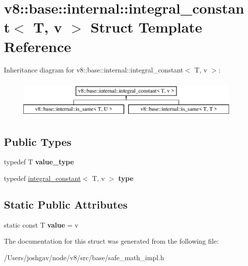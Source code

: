 \hypertarget{structv8_1_1base_1_1internal_1_1integral__constant}{}\section{v8\+:\+:base\+:\+:internal\+:\+:integral\+\_\+constant$<$ T, v $>$ Struct Template Reference}
\label{structv8_1_1base_1_1internal_1_1integral__constant}
Inheritance diagram for v8\+:\+:base\+:\+:internal\+:\+:integral\+\_\+constant$<$ T, v $>$\+:\begin{figure}[H]
\begin{center}
\leavevmode
\includegraphics[height=2.000000cm]{structv8_1_1base_1_1internal_1_1integral__constant}
\end{center}
\end{figure}
\subsection*{Public Types}
\begin{DoxyCompactItemize}
\item 
typedef T {\bfseries value\+\_\+type}\hypertarget{structv8_1_1base_1_1internal_1_1integral__constant_adc3e083f08bc1035153fe02ab192c418}{}\label{structv8_1_1base_1_1internal_1_1integral__constant_adc3e083f08bc1035153fe02ab192c418}

\item 
typedef \hyperlink{structv8_1_1base_1_1internal_1_1integral__constant}{integral\+\_\+constant}$<$ T, v $>$ {\bfseries type}\hypertarget{structv8_1_1base_1_1internal_1_1integral__constant_a8af419695b338aa7172016087b2064c2}{}\label{structv8_1_1base_1_1internal_1_1integral__constant_a8af419695b338aa7172016087b2064c2}

\end{DoxyCompactItemize}
\subsection*{Static Public Attributes}
\begin{DoxyCompactItemize}
\item 
static const T {\bfseries value} = v\hypertarget{structv8_1_1base_1_1internal_1_1integral__constant_a27a0cb6f9f5b1f7c39f22d705a8e320a}{}\label{structv8_1_1base_1_1internal_1_1integral__constant_a27a0cb6f9f5b1f7c39f22d705a8e320a}

\end{DoxyCompactItemize}


The documentation for this struct was generated from the following file\+:\begin{DoxyCompactItemize}
\item 
/\+Users/joshgav/node/v8/src/base/safe\+\_\+math\+\_\+impl.\+h\end{DoxyCompactItemize}
